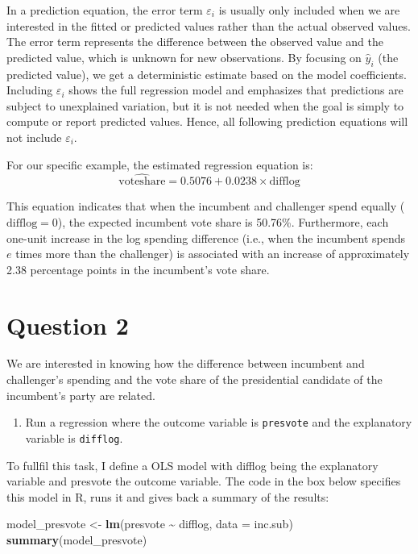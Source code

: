 \documentclass[
]{article}
\newenvironment{Shaded}{\begin{snugshade}}{\end{snugshade}}
\newcommand{\AttributeTok}[1]{\textcolor[rgb]{0.13,0.29,0.53}{#1}}
\newcommand{\FunctionTok}[1]{\textcolor[rgb]{0.13,0.29,0.53}{\textbf{#1}}}
\newcommand{\NormalTok}[1]{#1}
\newcommand{\OtherTok}[1]{\textcolor[rgb]{0.56,0.35,0.01}{#1}}
\newcommand{\SpecialCharTok}[1]{\textcolor[rgb]{0.81,0.36,0.00}{\textbf{#1}}}
\begin{document}
In a prediction equation, the error term $\varepsilon_i$ is usually only included when we are interested in the fitted or predicted values rather than the actual observed values. The error term represents the difference between the observed value and the predicted value, which is unknown for new observations. By focusing on $\hat{y}_i$ (the predicted value), we get a deterministic estimate based on the model coefficients. Including $\varepsilon_i$ shows the full regression model and emphasizes that predictions are subject to unexplained variation, but it is not needed when the goal is simply to compute or report predicted values. Hence, all following prediction equations will not include $\varepsilon_i$.


\noindent For our specific example, the estimated regression equation is:
\[
\widehat{\text{voteshare}} = 0.5076 + 0.0238 \times \text{difflog}
\]

This equation indicates that when the incumbent and challenger spend equally (\(\text{difflog} = 0\)), the expected incumbent vote share is 50.76\%. Furthermore, each one-unit increase in the log spending difference (i.e., when the incumbent spends \(e\) times more than the challenger) is associated with an increase of approximately 2.38 percentage points in the incumbent’s vote share.


\section*{Question 2}
\noindent We are interested in knowing how the difference between incumbent and challenger's spending and the vote share of the presidential candidate of the incumbent's party are related.	\vspace{.5cm}
\begin{enumerate}
	\item Run a regression where the outcome variable is \texttt{presvote} and the explanatory variable is \texttt{difflog}.
\end{enumerate}
To fullfil this task, I define a OLS model with difflog being the explanatory variable and presvote the outcome variable. The code in the box below specifies this model in R, runs it and gives back a summary of the results:
\begin{Shaded}
	\begin{Highlighting}[]
\NormalTok{model\_presvote }\OtherTok{\textless{}{-}} \FunctionTok{lm}\NormalTok{(presvote }\SpecialCharTok{\textasciitilde{}}\NormalTok{ difflog, }\AttributeTok{data =}\NormalTok{ inc.sub)}
\FunctionTok{summary}\NormalTok{(model\_presvote)}
	\end{Highlighting}
\end{Shaded}
\end{document}

